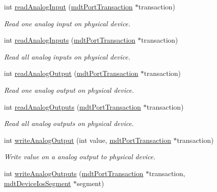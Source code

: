 \begin{DoxyCompactItemize}
\item 
int \hyperlink{classmdt_device_modbus_aa2a024793ae2a5e81c7e92260a70cd9e}{read\-Analog\-Input} (\hyperlink{classmdt_port_transaction}{mdt\-Port\-Transaction} $\ast$transaction)
\begin{DoxyCompactList}\small\item\em Read one analog input on physical device. \end{DoxyCompactList}\item 
int \hyperlink{classmdt_device_modbus_a846af6dbf80bbf747f3f966420ef6f92}{read\-Analog\-Inputs} (\hyperlink{classmdt_port_transaction}{mdt\-Port\-Transaction} $\ast$transaction)
\begin{DoxyCompactList}\small\item\em Read all analog inputs on physical device. \end{DoxyCompactList}\item 
int \hyperlink{classmdt_device_modbus_a30c815cbe5e603e8114dcbc09849e322}{read\-Analog\-Output} (\hyperlink{classmdt_port_transaction}{mdt\-Port\-Transaction} $\ast$transaction)
\begin{DoxyCompactList}\small\item\em Read one analog output on physical device. \end{DoxyCompactList}\item 
int \hyperlink{classmdt_device_modbus_ae02dd44f1d873fcc15ff75d781b62b0b}{read\-Analog\-Outputs} (\hyperlink{classmdt_port_transaction}{mdt\-Port\-Transaction} $\ast$transaction)
\begin{DoxyCompactList}\small\item\em Read all analog outputs on physical device. \end{DoxyCompactList}\item 
int \hyperlink{classmdt_device_modbus_ac63297a31205759622f341525c34251f}{write\-Analog\-Output} (int value, \hyperlink{classmdt_port_transaction}{mdt\-Port\-Transaction} $\ast$transaction)
\begin{DoxyCompactList}\small\item\em Write value on a analog output to physical device. \end{DoxyCompactList}\item 
int \hyperlink{classmdt_device_modbus_aa09d1682bef4bbc08b59b20110e613ff}{write\-Analog\-Outputs} (\hyperlink{classmdt_port_transaction}{mdt\-Port\-Transaction} $\ast$transaction, \hyperlink{classmdt_device_ios_segment}{mdt\-Device\-Ios\-Segment} $\ast$segment)

\end{DoxyCompactItemize}
